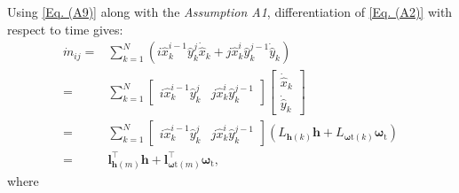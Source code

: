 \documentclass[lettersize,journal]{IEEEtran}
\begin{document}
Using \eqref{Eq. (A9)} along with the \textit{Assumption A1}, differentiation of \eqref{Eq. (A2)} with respect to time gives:
\begin{align} \label{Eq. (A11)}
    \dot{m}_{ij} =& \sum^{N}_{k=1} \left( i\hat{x}_k^{i-1} \hat{y}_k^{j} \dot{\hat{x}}_k + j\hat{x}_k^{i} \hat{y}_k^{j-1} \dot{\hat{y}}_k \right) \nonumber \\
    =& \sum^{N}_{k=1} \begin{bmatrix}
         i\hat{x}_k^{i-1} \hat{y}_k^{j} & j\hat{x}_k^{i} \hat{y}_k^{j-1}
    \end{bmatrix} \begin{bmatrix} \dot{\hat{x}}_{k} \\ \dot{\hat{y}}_{k} \end{bmatrix} \nonumber \\
    =& \sum^{N}_{k=1} \begin{bmatrix}
         i\hat{x}_k^{i-1} \hat{y}_k^{j} & j\hat{x}_k^{i} \hat{y}_k^{j-1}
    \end{bmatrix} \left( L_{\boldsymbol{h}(k)} \boldsymbol{h} + L_{\boldsymbol{\omega}\text{t}(k)} \boldsymbol{\omega}_{\text{t}} \right) \nonumber \\
    =& \boldsymbol{l}_{\boldsymbol{h}(m)}^{\top} \boldsymbol{h} + \boldsymbol{l}_{\boldsymbol{\omega}\text{t}(m)}^{\top} \boldsymbol{\omega}_{\text{t}},
\end{align}
where
\end{document}
